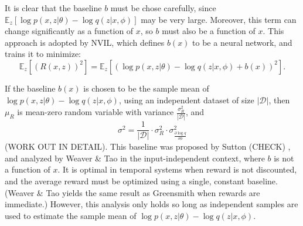 \documentclass{article} %
\begin{document}
It is clear that the baseline $b$ must be chose carefully, since $\mathbb{E}_z \left[ \log p(x,z | \theta) - \log q(z | x, \phi) \right]$ may be very large.  Moreover, this term can change significantly as a function of $x$, so $b$ must also be a function of $x$.  This approach is adopted by NVIL, which defines $b(x)$ to be a neural network, and trains it to minimize:
\begin{equation*}
\mathbb{E}_z \left[ \left(R(x,z) \right)^2 \right] = \mathbb{E}_z \left[ \left( \log p(x,z | \theta) - \log q(z | x, \phi) + b(x) \right)^2 \right].
\end{equation*}

If the baseline $b(x)$ is chosen to be the sample mean of $\log p(x,z|\theta) - \log q(z | x, \phi)$, using an independent dataset of size $|\mathcal{D}|$, then $\mu_R$ is mean-zero random variable with variance $\frac{\sigma_R^2}{|\mathcal{D}|}$, and 
\begin{equation*}
\sigma^2 = \frac{1}{|\mathcal{D} |} \cdot \sigma_R^2 \cdot \sigma_{\frac{\partial \log q}{\partial \phi}}^2
\end{equation*}
(WORK OUT IN DETAIL).  This baseline was proposed by Sutton (CHECK) \cite{sutton1984temporal}, and analyzed by Weaver \& Tao \cite{weaver2001optimal} in the input-independent context, where $b$ is not a function of $x$.  It is optimal in temporal systems when reward is not discounted, and the average reward must be optimized using a single, constant baseline.  (Weaver \& Tao yields the same result as Greensmith when rewards are immediate.)  However, this analysis only holds so long as independent samples are used to estimate the sample mean of $\log p(x,z|\theta) - \log q(z | x, \phi)$.
\end{document}
